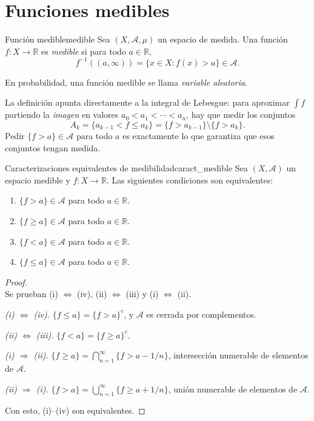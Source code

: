 \documentclass[11pt, a4paper]{article}
\begin{document}
\newpage

\section{Funciones medibles}

\begin{definicion}{Función medible}{medible}
Sea $(X, \mathcal{A}, \mu)$ un espacio de medida. Una función $f: X \to \mathbb{R}$ es
\emph{medible} si para todo $a \in \mathbb{R}$,
$$ f^{-1}((a, \infty)) = \{ x \in X : f(x) > a \} \in \mathcal{A}. $$
\end{definicion}

\obs En probabilidad, una función medible se llama \emph{variable aleatoria}.

\obs La definición apunta directamente a la integral de Lebesgue: para aproximar $\int f$
partiendo la \emph{imagen} en valores $a_0 < a_1 < \cdots < a_n$, hay que medir los conjuntos
$$ A_k = \{a_{k-1} < f \le a_k\} = \{f > a_{k-1}\} \setminus \{f > a_k\}. $$
Pedir $\{f > a\} \in \mathcal{A}$ para todo $a$ es exactamente lo que garantiza que esos
conjuntos tengan medida.

\begin{proposicion}{Caracterizaciones equivalentes de medibilidad}{caract_medible}
Sea $(X, \mathcal{A})$ un espacio medible y $f: X \to \mathbb{R}$. Las siguientes condiciones son
equivalentes:
\begin{enumerate}
    \item $\{f > a\} \in \mathcal{A}$ para todo $a \in \mathbb{R}$.
    \item $\{f \ge a\} \in \mathcal{A}$ para todo $a \in \mathbb{R}$.
    \item $\{f < a\} \in \mathcal{A}$ para todo $a \in \mathbb{R}$.
    \item $\{f \le a\} \in \mathcal{A}$ para todo $a \in \mathbb{R}$.
\end{enumerate}
\end{proposicion}

\begin{proof}\leavevmode\\
Se prueban (i) $\Leftrightarrow$ (iv), (ii) $\Leftrightarrow$ (iii) y (i) $\Leftrightarrow$ (ii).

\textit{(i) $\Leftrightarrow$ (iv).} $\{f \le a\} = \{f > a\}^c$, y $\mathcal{A}$ es cerrada por
complementos.

\textit{(ii) $\Leftrightarrow$ (iii).} $\{f < a\} = \{f \ge a\}^c$.

\textit{(i) $\Rightarrow$ (ii).} $\{f \ge a\} = \bigcap_{n=1}^\infty \{f > a - 1/n\}$,
intersección
numerable de elementos de $\mathcal{A}$.

\textit{(ii) $\Rightarrow$ (i).} $\{f > a\} = \bigcup_{n=1}^\infty \{f \ge a + 1/n\}$, unión
numerable de elementos de $\mathcal{A}$.

Con esto, (i)--(iv) son equivalentes.
\end{proof}
\end{document}
